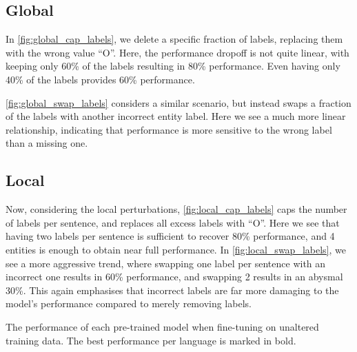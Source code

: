 \documentclass{article}
\begin{document}
\subsection{Global}

In \autoref{fig:global_cap_labels}, we delete a specific fraction of labels, replacing them with the wrong value ``O''. Here, the performance dropoff is not quite linear, with keeping only 60\% of the labels resulting in 80\% performance. Even having only 40\% of the labels provides 60\% performance.

\autoref{fig:global_swap_labels} considers a similar scenario, but instead swaps a fraction of the labels with another incorrect entity label. Here we see a much more linear relationship, indicating that performance is more sensitive to the wrong label than a missing one.
\subsection{Local}
Now, considering the local perturbations, \autoref{fig:local_cap_labels} caps the number of labels per sentence, and replaces all excess labels with ``O''. Here we see that having two labels per sentence is sufficient to recover 80\% performance, and 4 entities is enough to obtain near full performance. In \autoref{fig:local_swap_labels}, we see a more aggressive trend, where swapping one label per sentence with an incorrect one results in 60\% performance, and swapping 2 results in an abysmal 30\%. This again emphasises that incorrect labels are far more damaging to the model's performance compared to merely removing labels.

\begin{table}[]
    \centering
    \caption{The performance of each pre-trained model when fine-tuning on unaltered training data. The best performance per language is marked in bold.}
    \label{tab:performance_all}
    \begin{adjustbox}{width=1\linewidth}
    
    \end{adjustbox}
\end{table}
\end{document}
